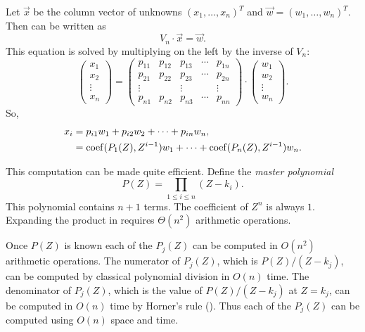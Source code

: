 Let $\vec{x}$ be the column vector of unknowns $(x_1, \ldots, x_n)^T$
and $\vec{w} = (w_1, \ldots, w_n)^T$.  Then 
can be written as
\[
V_n \cdot \vec{x} = \vec{w}.
\]
This equation is solved by multiplying on the left by the inverse of $V_n$:
\[
\left(
\begin{array}{c} x_1 \\ x_2 \\ \vdots \\ x_n \end{array}
\right) =
\left(
 \begin{array}{ccccc}
    p_{11}&p_{12}&p_{13}&\cdots&p_{1n}\\
    p_{21}&p_{22}&p_{23}&\cdots&p_{2n}\\
    \vdots& & \vdots& &\vdots\\
    p_{n1}&p_{n2}&p_{n3}&\cdots&p_{nn}
 \end{array}\right)
\cdot
\left(
\begin{array}{c} w_1 \\ w_2 \\ \vdots \\ w_n \end{array}
\right).
\]
So,
\begin{equation} \label{VanderSol:Eq}
\begin{aligned}
x_i & = p_{i1} w_1 + p_{i2} w_2 + \cdots + p_{in} w_n, \\
     &= \mathop{\rm coef}\nolimits(P_1(Z), Z^{i-1}) w_1 + \cdots
       + \mathop{\rm coef}\nolimits(P_n(Z), Z^{i-1}) w_n.
\end{aligned}
\end{equation}

This computation can be made quite efficient.  Define the {\em master 
polynomial} 
\begin{equation}
P(Z) = \prod_{1\le i \le n} \left(Z - k_i\right).
\label{Big:Poly:Eq}
\end{equation}
This polynomial contains $n+1$ terms.  The coefficient of $Z^n$ is
always $1$.  Expanding the product in 
requires $\Theta(n^2)$ arithmetic operations.  

Once $P(Z)$ is known each of the $P_j(Z)$ can be computed
in $O(n^2)$ arithmetic operations.  The numerator of $P_j(Z)$, which
is $P(Z)/(Z - k_j)$, can be computed by classical polynomial division
in $O(n)$ time.  The denominator of $P_j(Z)$, which is the value of
$P(Z)/(Z-k_j)$ at $Z = k_j$, can be computed in $O(n)$ time by
Horner's rule ().  Thus each of the $P_j(Z)$
can be computed using $O(n)$ space and time.

